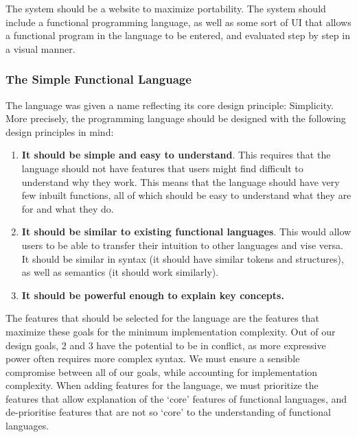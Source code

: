 The system should be a website to maximize portability. The system should include a functional programming language, as well as some sort of UI that allows a functional program in the language to be entered, and evaluated step by step in a visual manner. 


\subsubsection{The Simple Functional Language}
\label{design:goals}
The language was given a name reflecting its core design principle: Simplicity. More precisely, the programming language should be designed with the following design principles in mind:
\begin{enumerate}
    \item \textbf{It should be simple and easy to understand}. This requires that the language should not have features that users might find difficult to understand why they work. This means that the language should have very few inbuilt functions, all of which should be easy to understand what they are for and what they do. 
    \item \textbf{It should be similar to existing functional languages}. This would allow users to be able to transfer their intuition to other languages and vise versa. It should be similar in syntax (it should have similar tokens and structures), as well as semantics (it should work similarly). 
    \item \textbf{It should be powerful enough to explain key concepts.}
\end{enumerate}
The features that should be selected for the language are the features that maximize these goals for the minimum implementation complexity. Out of our design goals, 2 and 3 have the potential to be in conflict, as more expressive power often requires more complex syntax. We must ensure a sensible compromise between all of our goals, while accounting for implementation complexity. When adding features for the language, we must prioritize the features that allow explanation of the `core' features of functional languages, and de-prioritise features that are not so `core' to the understanding of functional languages. 

